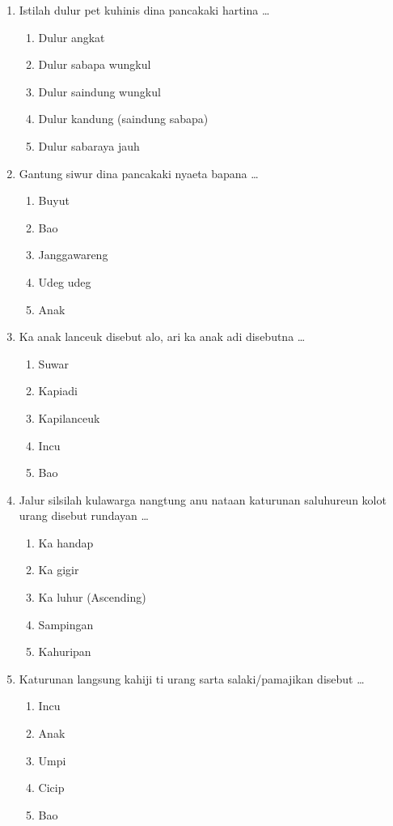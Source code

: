 \documentclass[12pt,a4paper]{article}
\begin{document}
\begin{enumerate}[leftmargin=*]
\item Istilah dulur pet kuhinis dina pancakaki hartina \dots
    \begin{enumerate}[label=\alph*.]
        \item Dulur angkat
        \item Dulur sabapa wungkul
        \item Dulur saindung wungkul
        \item Dulur kandung (saindung sabapa)
        \item Dulur sabaraya jauh
    \end{enumerate}

\item Gantung siwur dina pancakaki nyaeta bapana \dots
    \begin{enumerate}[label=\alph*.]
        \item Buyut
        \item Bao
        \item Janggawareng
        \item Udeg udeg
        \item Anak
    \end{enumerate}

\item Ka anak lanceuk disebut alo, ari ka anak adi disebutna \dots
    \begin{enumerate}[label=\alph*.]
        \item Suwar
        \item Kapiadi
        \item Kapilanceuk
        \item Incu
        \item Bao
    \end{enumerate}

\item Jalur silsilah kulawarga nangtung anu nataan katurunan saluhureun kolot urang disebut rundayan \dots
    \begin{enumerate}[label=\alph*.]
        \item Ka handap
        \item Ka gigir
        \item Ka luhur (Ascending)
        \item Sampingan
        \item Kahuripan
    \end{enumerate}

\item Katurunan langsung kahiji ti urang sarta salaki/pamajikan disebut \dots
    \begin{enumerate}[label=\alph*.]
        \item Incu
        \item Anak
        \item Umpi
        \item Cicip
        \item Bao
    \end{enumerate}


\end{enumerate}
\end{document}

